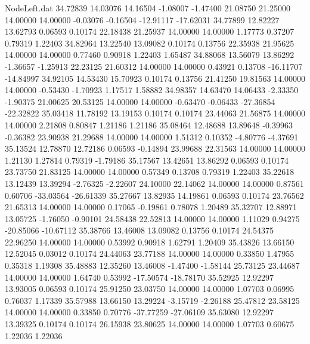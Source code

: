 \begin{filecontents}{NodeLeft.dat}
  34.72839   14.03076   14.16504    -1.08007   -1.47400   21.08750   21.25000   14.00000   14.00000   -0.03076   -0.16504  -12.91117  -17.62031
  34.77899   12.82227   13.62793     0.06593    0.10174   22.18438   21.25937   14.00000   14.00000    1.17773    0.37207    0.79319    1.22403
  34.82964   13.22540   13.09082     0.10174    0.13756   22.35938   21.95625   14.00000   14.00000    0.77460    0.90918    1.22403    1.65487
  34.88068   13.56079   13.86292    -1.36657   -1.25913   22.23125   21.60312   14.00000   14.00000    0.43921    0.13708  -16.11707  -14.84997
  34.92105   14.53430   15.70923     0.10174    0.13756   21.41250   19.81563   14.00000   14.00000   -0.53430   -1.70923    1.17517    1.58882
  34.98357   14.63470   14.06433    -2.33350   -1.90375   21.00625   20.53125   14.00000   14.00000   -0.63470   -0.06433  -27.36854  -22.32822
  35.03418   11.78192   13.19153     0.10174    0.10174   23.44063   21.56875   14.00000   14.00000    2.21808    0.80847    1.21186    1.21186
  35.08464   12.48688   13.89648    -0.39963   -0.36382   23.90938   21.29688   14.00000   14.00000    1.51312    0.10352   -4.80776   -4.37691
  35.13524   12.78870   12.72186     0.06593   -0.14894   23.99688   22.31563   14.00000   14.00000    1.21130    1.27814    0.79319   -1.79186
  35.17567   13.42651   13.86292     0.06593    0.10174   23.73750   21.83125   14.00000   14.00000    0.57349    0.13708    0.79319    1.22403
  35.22618   13.12439   13.39294    -2.76325   -2.22607   24.10000   22.14062   14.00000   14.00000    0.87561    0.60706  -33.03564  -26.61339
  35.27667   13.82935   14.19861     0.06593    0.10174   23.76562   21.65313   14.00000   14.00000    0.17065   -0.19861    0.78078    1.20489
  35.32707   12.88971   13.05725    -1.76050   -0.90101   24.58438   22.52813   14.00000   14.00000    1.11029    0.94275  -20.85066  -10.67112
  35.38766   13.46008   13.09082     0.13756    0.10174   24.54375   22.96250   14.00000   14.00000    0.53992    0.90918    1.62791    1.20409
  35.43826   13.66150   12.52045     0.03012    0.10174   24.44063   23.77188   14.00000   14.00000    0.33850    1.47955    0.35318    1.19308
  35.48883   12.35260   13.46008    -1.47400   -1.58144   25.73125   23.44687   14.00000   14.00000    1.64740    0.53992  -17.50574  -18.78170
  35.52925   12.92297   13.93005     0.06593    0.10174   25.91250   23.03750   14.00000   14.00000    1.07703    0.06995    0.76037    1.17339
  35.57988   13.66150   13.29224    -3.15719   -2.26188   25.47812   23.58125   14.00000   14.00000    0.33850    0.70776  -37.77259  -27.06109
  35.63080   12.92297   13.39325     0.10174    0.10174   26.15938   23.80625   14.00000   14.00000    1.07703    0.60675    1.22036    1.22036

\end{filecontents}
